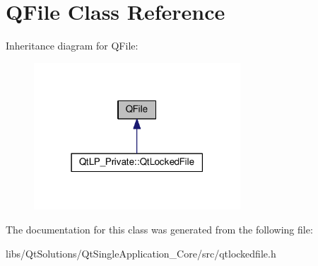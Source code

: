\hypertarget{class_q_file}{}\section{Q\+File Class Reference}
\label{class_q_file}


Inheritance diagram for Q\+File\+:\nopagebreak
\begin{figure}[H]
\begin{center}
\leavevmode
\includegraphics[width=219pt]{class_q_file__inherit__graph}
\end{center}
\end{figure}


The documentation for this class was generated from the following file\+:\begin{DoxyCompactItemize}
\item 
libs/\+Qt\+Solutions/\+Qt\+Single\+Application\+\_\+\+Core/src/qtlockedfile.\+h\end{DoxyCompactItemize}
